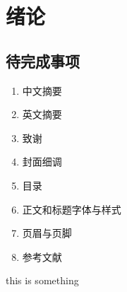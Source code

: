 \documentclass{scuthesis}
\begin{document}
	\makecover
	\chapter{绪论}
	\section{待完成事项}
	\begin{enumerate}
		\setlength{\itemsep}{-2pt}
		\item 中文摘要
		\item 英文摘要
		\item 致谢
		\item 封面细调
		\item 目录
		\item 正文和标题字体与样式
		\item 页眉与页脚
		\item 参考文献
	\end{enumerate}

this is something
\end{document}
